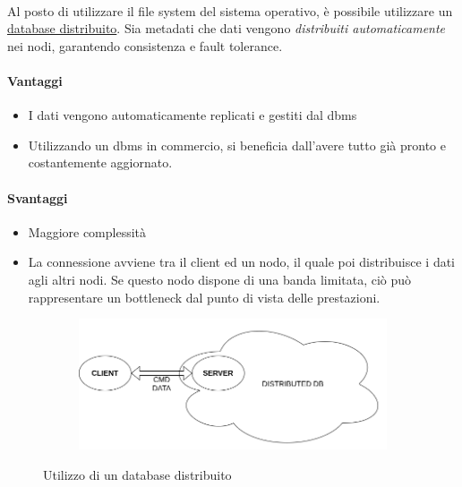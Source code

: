 \documentclass{article}
\begin{document}
\paragraph{} Al posto di utilizzare il file system del sistema operativo, è possibile utilizzare un \underline{database distribuito}. Sia metadati che dati vengono \emph{distribuiti automaticamente} nei nodi, garantendo consistenza e fault tolerance. 


\paragraph{Vantaggi} \begin{itemize}
	\item I dati vengono automaticamente replicati e gestiti dal dbms
	\item Utilizzando un dbms in commercio, si beneficia dall'avere tutto già pronto e costantemente aggiornato.
\end{itemize}


\paragraph{Svantaggi} \begin{itemize}
	\item Maggiore complessità
	\item La connessione avviene tra il client ed un nodo, il quale poi distribuisce i dati agli altri nodi. Se questo nodo dispone di una banda limitata, ciò può rappresentare un bottleneck dal punto di vista delle prestazioni. 
\end{itemize}

\begin{figure}[H]
	\centering
	\begin{subfigure}{0.80\linewidth}
		\includegraphics[width=\linewidth]{../diagrams/architettura/4.png}
	\end{subfigure}
	\caption{Utilizzo di un database distribuito}
\end{figure}
\end{document}
